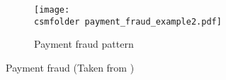 \begin{figure}[t!]
    \def\wscorevone{0.49}
    \centering
        \begin{subfigure}[t]{\wscorevone\linewidth}
            \centering
            \resizebox{\linewidth}{!}
            {
                \texttt{[image: \\csmfolder payment\_fraud\_example2.pdf]}
            }
            \caption{Payment fraud pattern}
            \label{fig:payment-fraud-querygraph}
        \end{subfigure}
        \caption{Payment fraud (Taken from \protect \cite{csm-timing-DBLP:conf/icde/Li0O019})}
        \label{fig:payment-fraud}
    \end{figure}